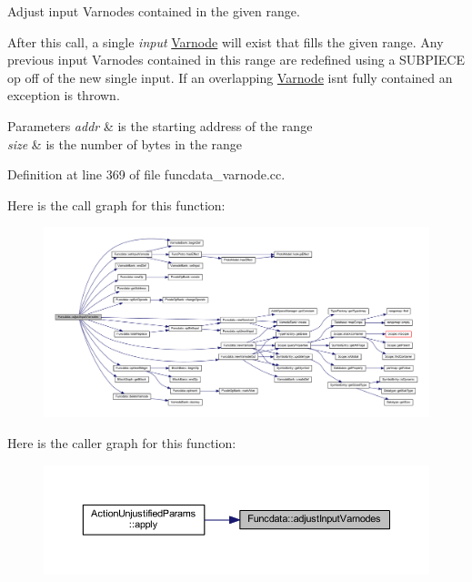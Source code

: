 Adjust input Varnodes contained in the given range. 

After this call, a single {\itshape input} \mbox{\hyperlink{class_varnode}{Varnode}} will exist that fills the given range. Any previous input Varnodes contained in this range are redefined using a S\+U\+B\+P\+I\+E\+CE op off of the new single input. If an overlapping \mbox{\hyperlink{class_varnode}{Varnode}} isn\textquotesingle{}t fully contained an exception is thrown. 
\begin{DoxyParams}{Parameters}
{\em addr} & is the starting address of the range \\
\hline
{\em size} & is the number of bytes in the range \\
\hline
\end{DoxyParams}


Definition at line 369 of file funcdata\+\_\+varnode.\+cc.

Here is the call graph for this function\+:
\nopagebreak
\begin{figure}[H]
\begin{center}
\leavevmode
\includegraphics[width=350pt]{class_funcdata_a35c51952540dbda3f11962b22c3064a3_cgraph}
\end{center}
\end{figure}
Here is the caller graph for this function\+:
\nopagebreak
\begin{figure}[H]
\begin{center}
\leavevmode
\includegraphics[width=350pt]{class_funcdata_a35c51952540dbda3f11962b22c3064a3_icgraph}
\end{center}
\end{figure}
\mbox{\label{class_funcdata_adfa02a817ac34b428cac2a327d1891c0}} 
